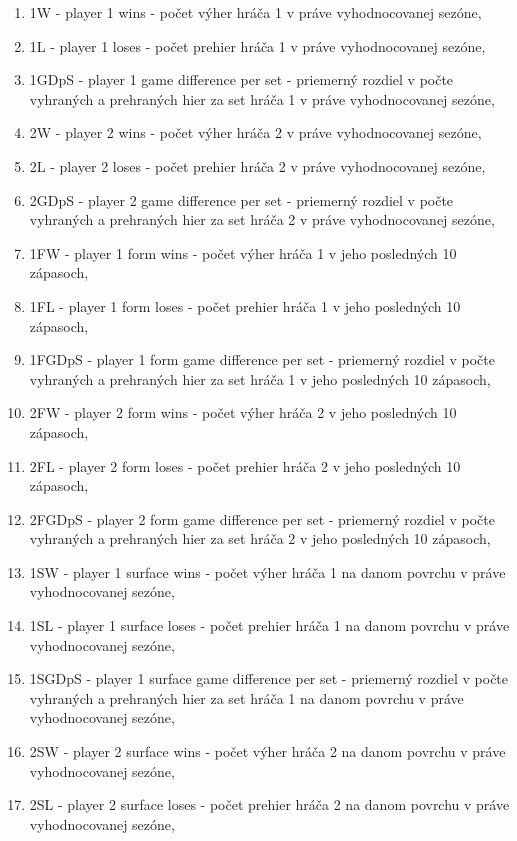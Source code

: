 \begin{enumerate}
 \item 1W - player 1 wins - počet výher hráča 1 v práve vyhodnocovanej sezóne,
 \item 1L - player 1 loses - počet prehier hráča 1 v práve vyhodnocovanej sezóne,
 \item 1GDpS - player 1 game difference per set - priemerný rozdiel v počte vyhraných a prehraných hier za set hráča 1 v práve vyhodnocovanej sezóne,
 \item 2W - player 2 wins - počet výher hráča 2 v práve vyhodnocovanej sezóne,
 \item 2L - player 2 loses - počet prehier hráča 2 v práve vyhodnocovanej sezóne,
 \item 2GDpS - player 2 game difference per set - priemerný rozdiel v počte vyhraných a prehraných hier za set hráča 2 v práve vyhodnocovanej sezóne,
 \item 1FW - player 1 form wins - počet výher hráča 1 v jeho posledných 10 zápasoch,
 \item 1FL - player 1 form loses - počet prehier hráča 1 v jeho posledných 10 zápasoch,
 \item 1FGDpS - player 1 form game difference per set - priemerný rozdiel v počte vyhraných a prehraných hier za set hráča 1 v jeho posledných 10 zápasoch,
 \item 2FW - player 2 form wins - počet výher hráča 2 v jeho posledných 10 zápasoch,
 \item 2FL - player 2 form loses - počet prehier hráča 2 v jeho posledných 10 zápasoch,
 \item 2FGDpS - player 2 form game difference per set - priemerný rozdiel v počte vyhraných a prehraných hier za set hráča 2 v jeho posledných 10 zápasoch,
 \item 1SW - player 1 surface wins - počet výher hráča 1 na danom povrchu v práve vyhodnocovanej sezóne,
 \item 1SL - player 1 surface loses - počet prehier hráča 1 na danom povrchu v práve vyhodnocovanej sezóne,
 \item 1SGDpS - player 1 surface game difference per set - priemerný rozdiel v počte vyhraných a prehraných hier za set hráča 1 na danom povrchu v práve vyhodnocovanej sezóne,
 \item 2SW - player 2 surface wins - počet výher hráča 2 na danom povrchu v práve vyhodnocovanej sezóne,
 \item 2SL - player 2 surface loses - počet prehier hráča 2 na danom povrchu v práve vyhodnocovanej sezóne,

\end{enumerate}
